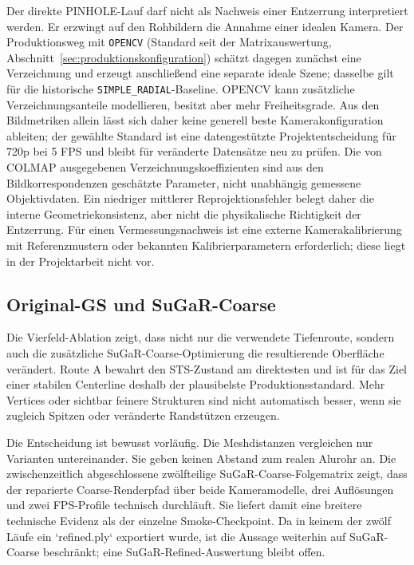 Der direkte PINHOLE-Lauf darf nicht als Nachweis einer Entzerrung interpretiert
werden. Er erzwingt auf den Rohbildern die Annahme einer idealen Kamera. Der
Produktionsweg mit \texttt{OPENCV} (Standard seit der Matrixauswertung,
Abschnitt~\ref{sec:produktionskonfiguration}) schätzt dagegen zunächst eine
Verzeichnung und erzeugt anschließend eine separate ideale Szene; dasselbe
gilt für die historische \texttt{SIMPLE\_RADIAL}-Baseline. OPENCV kann
zusätzliche Verzeichnungsanteile modellieren, besitzt aber mehr
Freiheitsgrade. Aus den Bildmetriken allein lässt sich daher keine generell
beste Kamerakonfiguration ableiten; der gewählte Standard ist eine
datengestützte Projektentscheidung für 720p bei 5 FPS und bleibt für
veränderte Datensätze neu zu prüfen. Die von COLMAP ausgegebenen
Verzeichnungskoeffizienten sind aus den Bildkorrespondenzen geschätzte
Parameter, nicht unabhängig gemessene Objektivdaten. Ein niedriger mittlerer
Reprojektionsfehler belegt daher die interne Geometriekonsistenz, aber nicht
die physikalische Richtigkeit der Entzerrung. Für einen Vermessungsnachweis
ist eine externe Kamerakalibrierung mit Referenzmustern oder bekannten
Kalibrierparametern erforderlich; diese liegt in der Projektarbeit nicht vor.

\subsection{Original-GS und SuGaR-Coarse}

Die Vierfeld-Ablation zeigt, dass nicht nur die verwendete Tiefenroute, sondern
auch die zusätzliche SuGaR-Coarse-Optimierung die resultierende Oberfläche
verändert. Route A bewahrt den STS-Zustand am direktesten und ist für das Ziel
einer stabilen Centerline deshalb der plausibelste Produktionsstandard. Mehr
Vertices oder sichtbar feinere Strukturen sind nicht automatisch besser, wenn
sie zugleich Spitzen oder veränderte Randstützen erzeugen.

Die Entscheidung ist bewusst vorläufig. Die Meshdistanzen vergleichen nur
Varianten untereinander. Sie geben keinen Abstand zum realen Alurohr an. Die
zwischenzeitlich abgeschlossene zwölfteilige SuGaR-Coarse-Folgematrix zeigt,
dass der reparierte Coarse-Renderpfad über beide Kameramodelle, drei
Auflösungen und zwei FPS-Profile technisch durchläuft. Sie liefert damit eine
breitere technische Evidenz als der einzelne Smoke-Checkpoint. Da in keinem
der zwölf Läufe ein `refined.ply` exportiert wurde, ist die Aussage weiterhin
auf SuGaR-Coarse beschränkt; eine SuGaR-Refined-Auswertung bleibt offen.

